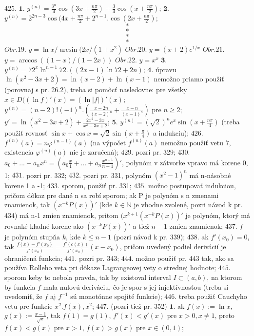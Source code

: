 $\boxed{425.}$ $\boldsymbol{1.}$ $y^{(n)}=\frac{3^{n}}{4}\cos (3x+\frac{n\pi}{2})+\frac{3}{4}\cos (x+ \frac{n\pi}{2}) $;
$\boldsymbol{2.}$ $y^{(n)}=2^{2n-3}\cos (4x+\frac{n\pi}{2}+2^{n-1}.\cos (2x+\frac{n\pi}{2})$;
$$*$$
$$*$$
$$*$$
$$*$$
$\boxed{Obr.19.}$  $y=\ln x / \arcsin (2x/(1+x^{2})$
$\boxed{Obr.20.}$  $y=(x+2)e^{1/x}$
$\boxed{Obr.21.}$  $y=\arccos((1-x)/(1-2x))$
$\boxed{Obr.22.}$  $y=x^{x}$
$\boldsymbol{3.}$ $y^{(n)}=72^{x}\ln ^{n-1} 72. ((2x-1)\ln 72+2n)$;
$\boldsymbol{4.}$ úpravu $\ln (x^{2}-3x+2)=\ln (x-2)+\ln(x-1)$ nemožno priamo použiť (porovnaj s pr. 26.2), treba si pomôcť nasledovne: pre všetky $x \in D((\ln f)'(x)=(\ln \vert f \vert )'(x)$; $y^{(n)}=(n-2)!(-1)^{n}.(\frac{x-2n}{(x-2)^{n}}+\frac{x-n}{(x-1)^{n}})$ pre $n\geq 2$; $y'=\ln (x^{2}-3x+2)+\frac{2x^{2}-3x}{x^{2}-3x+2}$;
$\boldsymbol{5.}$ $y^{(n)}=(\sqrt{2})^{n}e^{x} \sin (x+\frac{n\pi}{4})$ (treba použiť rovnosť $\sin x +\cos x=\sqrt{2} \sin (x+\frac{\pi}{4}) $ a indukciu);
$\boxed{426.}$ $f^{(n)}(a)=n\varphi ^{(n-1)}(a)$ (na výpočet $f^{(n)}(a)$ nemožno použiť vetu 7, existencia $\varphi ^{(n)}(a)$ nie je zaručená);
$\boxed{429.}$ pozri pr. 329;
$\boxed{430.}$ $a_{0}+...+a_{n}x^{n}=(a_{0}\frac{x}{1}+...+a_{n}\frac{x^{n+1}}{n+1})'$, polynóm v zátvorke vpravo má korene 0,  1;
$\boxed{431.}$ pozri pr. 332;
$\boxed{432.}$ pozri pr. 331, polynóm $(x^{2}-1)^{n}$ má n-násobné korene 1 a -1;
$\boxed{433.}$ sporom, použiť pr. 331;
$\boxed{435.}$ možno postupovať indukciou, pričom dôkaz pre dané n sa robí sporom; ak P je polynóm s n zmenami znamienok, tak $(x^{-k}P(x))'$ (kde $k\in \mathbb{N}$ je vhodne zvolené, pozri návod k pr. 434) má n-1 zmien znamienok, pritom $(x^{k+1}(x^{-k}P(x))'$ je polynóm, ktorý má rovnaké kladné korene ako $(x^{-k}P(x))'$ a tiež $n-1$ zmien znamienok;
$\boxed{437.}$ $f$ je polynóm stupňa $k$, kde $k\leq n-1$ (pozri návod k pr. 339);
$\boxed{438.}$ ak $f'(x_{0})=0$, tak $\frac{f(x)-f'(x_{0})}{f'(x_{0})} =\frac{f'(c(x))}{f'(x_{0})}(x-x_{0})$, pričom uvedený podiel derivácií je ohraničená funkcia;
$\boxed{441.}$ pozri pr. 343;
$\boxed{444.}$  možno použiť pr. 443 tak, ako sa používa Rolleho veta pri dôkaze Lagrangeovej vety o strednej hodnote;
$\boxed{445.}$ sporom	 keby to nebola pravda, tak by existoval interval $I\subset (a,b)$, na ktorom by funkcia $f$ mala nulovú deriváciu, čo je spor s jej injektívnosťou (treba si uvedomiť, že $f$ aj $f^{-1}$ sú monotónne spojité funkcie);
$\boxed{446.}$ treba použiť Cauchyho vetu pre funkcie $x^{2}.f(x),x^{2}$;
$\boxed{447.}$ (pozri tiež pr. 352)
$\boldsymbol{1.}$ ak $f(x):=\ln x$, $g(x):=\frac{x-1}{\sqrt{x}}$, tak $f(1)=g(1)$, $f'(x)< g'(x)$ pre $x>0, x\ne 1$, preto $f(x)< g(x)$ pre $x>1$,  $f(x)>g(x)$ pre $x\in (0,1)$;
